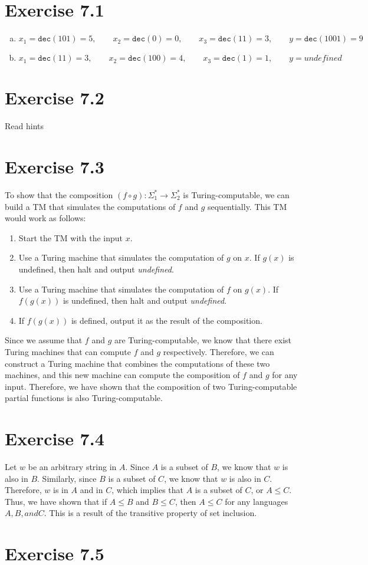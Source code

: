 \documentclass{article} %
\newcommand{\homeworkNumber}{7}
\begin{document}
\section*{Exercise \homeworkNumber.1}
\begin{enumerate}[(a)]
\item
$$
x_1 = \texttt{dec}(101) = 5,\qquad x_2 = \texttt{dec}(0) = 0,\qquad x_3 = \texttt{dec}(11) = 3,\qquad y = \texttt{dec}(1001) = 9
$$
\item
$$
x_1 = \texttt{dec}(11) = 3,\qquad x_2 = \texttt{dec}(100) = 4,\qquad x_3 = \texttt{dec}(1) = 1,\qquad y = \textit{undefined}
$$
\end{enumerate}

\section*{Exercise \homeworkNumber.2}
Read hints

\section*{Exercise \homeworkNumber.3}
To show that the composition $(f \circ g) : \Sigma_1^* \to \Sigma_2^*$ is Turing-computable, we can build a TM that simulates the computations of $f$ and $g$ sequentially. This TM would work as follows:
\begin{enumerate}
\item
Start the TM with the input $x$.
\item
Use a Turing machine that simulates the computation of $g$ on $x$. If $g(x)$ is undefined, then halt and output \textit{undefined}.
\item
Use a Turing machine that simulates the computation of $f$ on $g(x)$. If $f(g(x))$ is undefined, then halt and output \textit{undefined}.
\item
If $f(g(x))$ is defined, output it as the result of the composition.
\end{enumerate}
Since we assume that $f$ and $g$ are Turing-computable, we know that there exist Turing machines that can compute $f$ and $g$ respectively. Therefore, we can construct a Turing machine that combines the computations of these two machines, and this new machine can compute the composition of $f$ and $g$ for any input. Therefore, we have shown that the composition of two Turing-computable partial functions is also Turing-computable.

\section*{Exercise \homeworkNumber.4}
Let $w$ be an arbitrary string in $A$. Since $A$ is a subset of $B$, we know that $w$ is also in $B$. Similarly, since $B$ is a subset of $C$, we know that $w$ is also in $C$. Therefore, $w$ is in $A$ and in $C$, which implies that $A$ is a subset of $C$, or $A \le C$.\\
Thus, we have shown that if $A \le B$ and $B \le C$, then $A \le C$ for any languages $A, B, and C$. This is a result of the transitive property of set inclusion.

\section*{Exercise \homeworkNumber.5}
\end{document}
